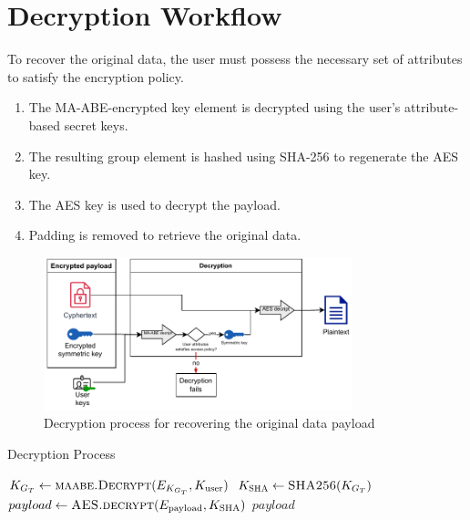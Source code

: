\documentclass[cic,tc,english]{iiufrgs}
\begin{document}
    \section{Decryption Workflow}
    \label{sec:decryption-workflow}

        To recover the original data, the user must possess the necessary set of attributes to satisfy the encryption policy.
        

        \begin{enumerate}
            \item The MA-ABE-encrypted key element is decrypted using the user's attribute-based secret keys.
            \item The resulting group element is hashed using SHA-256 to regenerate the AES key.
            \item The AES key is used to decrypt the payload.
            \item Padding is removed to retrieve the original data.
        \end{enumerate}

        \begin{figure}
            \centering
            \includegraphics[width=0.8\textwidth]{images/diagrams/decryption_diagram}
            \caption{Decryption process for recovering the original data payload}
            \label{fig:decryption_diagram}
        \end{figure}

        \begin{algorithm}
            \caption{Decryption Process}
            \label{alg:decryption_process}
            \scriptsize
            \begin{algorithmic}[1]
                \State $K_{G_T} \gets \textsc{maabe.Decrypt}(E_{K_{G_T}}, K_{\text{user}})$
                \State $K_{\textsc{SHA}} \gets \textsc{SHA256}(K_{G_T})$
                \State $payload \gets \textsc{AES.decrypt}(E_{\text{payload}}, K_{\text{SHA}})$
                \State \Return $payload$
            \EndProcedure
            \end{algorithmic}
        \end{algorithm}
\end{document}
